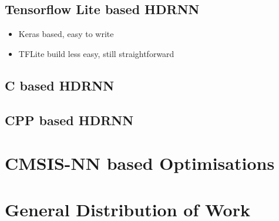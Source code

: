 \subsection[Tensorflow Lite]{Tensorflow Lite based HDRNN}
{\color{red}
	\begin{itemize}
		\item Keras based, easy to write
		\item TFLite build less easy, still straightforward
	\end{itemize}
}

\subsection[C]{C based HDRNN}

\subsection[CPP - Eigen]{CPP based HDRNN}

\section{CMSIS-NN based Optimisations}
\textit{}

\section{General Distribution of Work}
